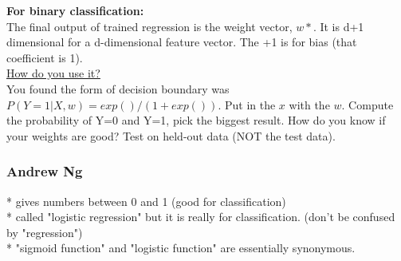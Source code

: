 \textbf{For binary classification:} \hfill \\
The final output of trained regression is the weight vector, $w*$.
It is d+1 dimensional for a d-dimensional feature vector.  The +1 is for bias (that coefficient is 1).  \hfill \\

\underline{How do you use it?}  \hfill \\
You found the form of decision boundary was $P(Y=1|X,w) = exp()/(1+ exp())$.
Put in the $x$ with the $w$.  
Compute the probability of Y=0 and Y=1, pick the biggest result. 
How do you know if your weights are good? 
Test on held-out data (NOT the test data). 

\subsubsection{Andrew Ng}
* gives numbers between 0 and 1 (good for classification)   \hfill \\
* called "logistic regression" but it is really for classification.  (don't be confused by "regression") \hfill \\
* "sigmoid function" and "logistic function" are essentially synonymous.  \hfill \\
 

